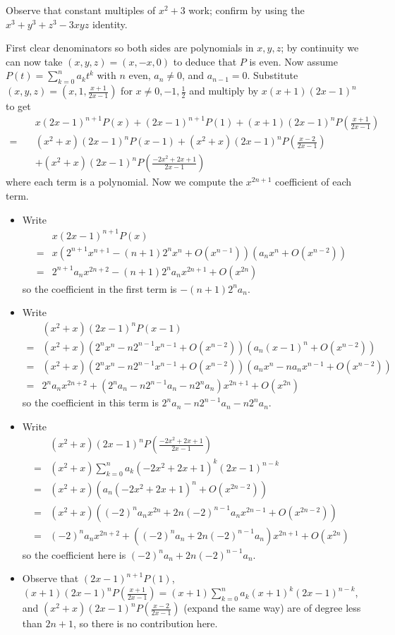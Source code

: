 Observe that constant multiples of $x^2+3$ work; confirm by using the $x^3+y^3+z^3-3xyz$ identity.

First clear denominators so both sides are polynomials in $x,y,z$; by continuity we can now take $(x,y,z)=(x,-x,0)$ to deduce that $P$ is even. Now assume $P(t)=\displaystyle\sum_{k=0}^na_kt^k$ with $n$ even, $a_n\neq0$, and $a_{n-1}=0$. Substitute $(x,y,z)=(x,1,\frac{x+1}{2x-1})$ for $x\neq0,-1,\frac{1}{2}$ and multiply by $x(x+1)(2x-1)^n$ to get
\begin{align*}
&x(2x-1)^{n+1}P(x)+(2x-1)^{n+1}P(1)+(x+1)(2x-1)^nP(\frac{x+1}{2x-1})\\
=\quad&(x^2+x)(2x-1)^nP(x-1)+(x^2+x)(2x-1)^nP(\frac{x-2}{2x-1})\\&+(x^2+x)(2x-1)^nP(\frac{-2x^2+2x+1}{2x-1})
\end{align*}
where each term is a polynomial. Now we compute the $x^{2n+1}$ coefficient of each term.
\begin{itemize}
	\item Write
	\begin{align*}
		&x(2x-1)^{n+1}P(x)\\
		=&x(2^{n+1}x^{n+1}-(n+1)2^nx^n+O(x^{n-1}))(a_nx^n+O(x^{n-2}))\\
		=&2^{n+1}a_nx^{2n+2}-(n+1)2^na_nx^{2n+1}+O(x^{2n})
	\end{align*}
	so the coefficient in the first term is $-(n+1)2^na_n$.
	\item Write
	\begin{align*}
		&(x^2+x)(2x-1)^nP(x-1)\\
		=&(x^2+x)(2^nx^n-n2^{n-1}x^{n-1}+O(x^{n-2}))(a_n(x-1)^n+O(x^{n-2}))\\
		=&(x^2+x)(2^nx^n-n2^{n-1}x^{n-1}+O(x^{n-2}))(a_nx^n-na_nx^{n-1}+O(x^{n-2}))\\
		=&2^na_nx^{2n+2}+(2^na_n-n2^{n-1}a_n-n2^na_n)x^{2n+1}+O(x^{2n})
	\end{align*}
	so the coefficient in this term is $2^na_n-n2^{n-1}a_n-n2^na_n$.
	\item Write
	\begin{align*}
		&(x^2+x)(2x-1)^nP(\frac{-2x^2+2x+1}{2x-1})\\
		=&(x^2+x)\sum_{k=0}^na_k(-2x^2+2x+1)^k(2x-1)^{n-k}\\
		=&(x^2+x)(a_n(-2x^2+2x+1)^n+O(x^{2n-2}))\\
		=&(x^2+x)((-2)^na_nx^{2n}+2n(-2)^{n-1}a_nx^{2n-1}+O(x^{2n-2}))\\
		=&(-2)^na_nx^{2n+2}+((-2)^na_n+2n(-2)^{n-1}a_n)x^{2n+1}+O(x^{2n})
	\end{align*}
	so the coefficient here is $(-2)^na_n+2n(-2)^{n-1}a_n$.
	\item Observe that $(2x-1)^{n+1}P(1)$, $(x+1)(2x-1)^nP(\frac{x+1}{2x-1})=(x+1)\displaystyle\sum_{k=0}^na_k(x+1)^k(2x-1)^{n-k}$, and $(x^2+x)(2x-1)^nP(\frac{x-2}{2x-1})$ (expand the same way) are of degree less than $2n+1$, so there is no contribution here.
\end{itemize}
